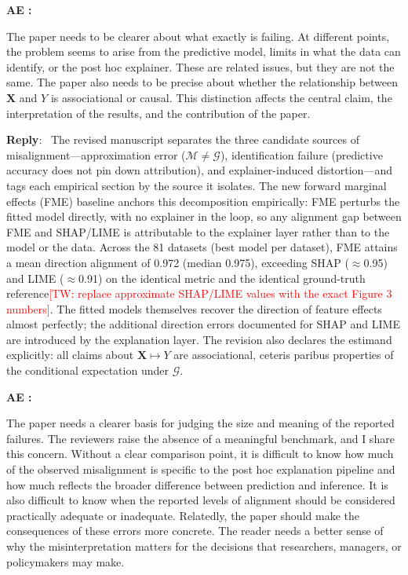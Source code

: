 \documentclass[11pt]{article}
\newcommand{\tw}[1]{\textcolor{red}{[TW: #1]}}
\newcounter{se}[section]
\newcounter{aed}[section]
\newenvironment{aed}[1][]{%
    \refstepcounter{aed}\par\medskip\noindent%
    \textbf{AE \theaed: #1}\rmfamily\itshape%
}{\medskip}
\newcounter{reviewer}
\newcounter{point}[reviewer]
\newenvironment{reply}
 {\par\medskip \noindent \begin{sf}\textbf{Reply}:\ }
 {\medskip \end{sf}}
\begin{document}
\begin{aed}
The paper needs to be clearer about what exactly is failing. At different points, the problem seems to arise from the predictive model, limits in what the data can identify, or the post hoc explainer. These are related issues, but they are not the same. The paper also needs to be precise about whether the relationship between $\mathbf{X}$ and $Y$ is associational or causal. This distinction affects the central claim, the interpretation of the results, and the contribution of the paper.
\end{aed}

\begin{reply}
{\color{red}
The revised manuscript separates the three candidate sources of misalignment---approximation error ($\mathcal{M}\neq\mathcal{G}$), identification failure (predictive accuracy does not pin down attribution), and explainer-induced distortion---and tags each empirical section by the source it isolates. The new forward marginal effects (FME) baseline anchors this decomposition empirically: FME perturbs the fitted model directly, with no explainer in the loop, so any alignment gap between FME and SHAP/LIME is attributable to the explainer layer rather than to the model or the data. Across the 81 datasets (best model per dataset), FME attains a mean direction alignment of 0.972 (median 0.975), exceeding SHAP ($\approx$0.95) and LIME ($\approx$0.91) on the identical metric and the identical ground-truth reference\tw{replace approximate SHAP/LIME values with the exact Figure 3 numbers}. The fitted models themselves recover the direction of feature effects almost perfectly; the additional direction errors documented for SHAP and LIME are introduced by the explanation layer. The revision also declares the estimand explicitly: all claims about $\mathbf{X} \mapsto Y$ are associational, ceteris paribus properties of the conditional expectation under $\mathcal{G}$.
}
\end{reply}


\begin{aed}
The paper needs a clearer basis for judging the size and meaning of the reported failures. The reviewers raise the absence of a meaningful benchmark, and I share this concern. Without a clear comparison point, it is difficult to know how much of the observed misalignment is specific to the post hoc explanation pipeline and how much reflects the broader difference between prediction and inference. It is also difficult to know when the reported levels of alignment should be considered practically adequate or inadequate. Relatedly, the paper should make the consequences of these errors more concrete. The reader needs a better sense of why the misinterpretation matters for the decisions that researchers, managers, or policymakers may make.
\end{aed}
\end{document}
